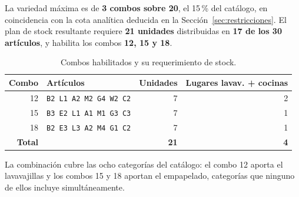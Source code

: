 \documentclass[10pt,a4paper]{article}
\newcommand{\art}[1]{\texttt{#1}}
\begin{document}
La variedad máxima es de \textbf{3 combos sobre 20}, el 15\,\% del catálogo, en
coincidencia con la cota analítica deducida en la
Sección~\ref{sec:restricciones}. El plan de stock resultante requiere
\textbf{21 unidades} distribuidas en \textbf{17 de los 30 artículos}, y habilita
los combos \textbf{12, 15 y 18}.

\begin{table}[H]
\centering\small
\caption{Combos habilitados y su requerimiento de stock.}
\label{tab:combos_e1}
\begin{tabular}{rlrr}
\toprule
\textbf{Combo} & \textbf{Artículos} & \textbf{Unidades} & \textbf{Lugares lavav. + cocinas} \\
\midrule
12 & \art{B2 L1 A2 M2 G4 W2 C2} & 7 & 2 \\
15 & \art{B3 E2 L1 A1 M1 G3 C3} & 7 & 1 \\
18 & \art{B2 E3 L3 A2 M4 G1 C2} & 7 & 1 \\
\midrule
\textbf{Total} & & \textbf{21} & \textbf{4} \\
\bottomrule
\end{tabular}
\end{table}

La combinación cubre las ocho categorías del catálogo: el combo 12 aporta el
lavavajillas y los combos 15 y 18 aportan el empapelado, categorías que ninguno
de ellos incluye simultáneamente.
\end{document}
